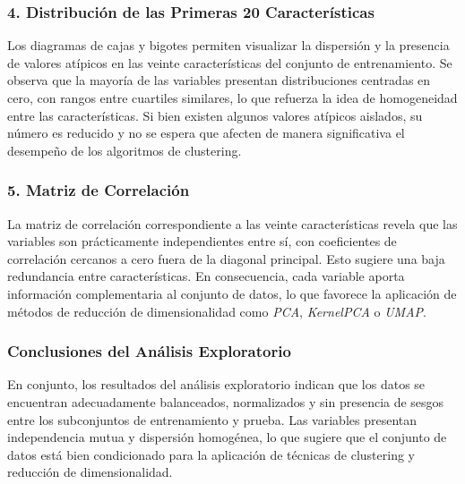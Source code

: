 \documentclass[12pt,a4paper]{article}
\begin{document}
\vspace{0.5em}

\subsubsection*{4. Distribución de las Primeras 20 Características}

Los diagramas de cajas y bigotes permiten visualizar la dispersión y la presencia de valores atípicos en las veinte características del conjunto de entrenamiento.
Se observa que la mayoría de las variables presentan distribuciones centradas en cero, con rangos entre cuartiles similares, lo que refuerza la idea de homogeneidad entre las características. 
Si bien existen algunos valores atípicos aislados, su número es reducido y no se espera que afecten de manera significativa el desempeño de los algoritmos de clustering.

\vspace{0.5em}

\subsubsection*{5. Matriz de Correlación}

La matriz de correlación correspondiente a las veinte características revela que las variables son prácticamente independientes entre sí, con coeficientes de correlación cercanos a cero fuera de la diagonal principal. 
Esto sugiere una baja redundancia entre características. 
En consecuencia, cada variable aporta información complementaria al conjunto de datos, lo que favorece la aplicación de métodos de reducción de dimensionalidad como \textit{PCA}, \textit{KernelPCA} o \textit{UMAP}.

\vspace{0.5em}

\subsubsection*{Conclusiones del Análisis Exploratorio}

En conjunto, los resultados del análisis exploratorio indican que los datos se encuentran adecuadamente balanceados, normalizados y sin presencia de sesgos entre los subconjuntos de entrenamiento y prueba. 
Las variables presentan independencia mutua y dispersión homogénea, lo que sugiere que el conjunto de datos está bien condicionado para la aplicación de técnicas de clustering y reducción de dimensionalidad.
\end{document}
